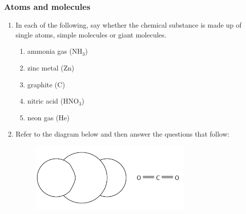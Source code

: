             \subsubsection{ Atoms and molecules         }
            \nopagebreak
            \label{m38120*id308039}\begin{enumerate}[noitemsep, label=\textbf{\arabic*}. ] 
            \label{m38120*uid11}\item In each of the following, say whether the chemical 
substance is made up of single atoms, simple molecules or giant molecules.
\label{m38120*id308055}\begin{enumerate}[noitemsep, label=\textbf{\alph*}. ] 
            \label{m38120*uid12}\item ammonia gas (\begin{math}{\mathrm{NH}}_{3}\end{math})
\label{m38120*uid13}\item zinc metal (\begin{math}\mathrm{Zn}\end{math})
\label{m38120*uid14}\item graphite (\begin{math}\mathrm{C}\end{math})
\label{m38120*uid15}\item nitric acid (\begin{math}{\mathrm{HNO}}_{3}\end{math})
\label{m38120*uid16}\item neon gas (\begin{math}\mathrm{He}\end{math})
\end{enumerate}
                
\label{m38120*uid17}\item Refer to the diagram below and then answer the 
questions that follow:

    \setcounter{subfigure}{0}


	\begin{figure}[H] %
    \begin{center}
    \label{m38120*id308155!!!underscore!!!media}\label{m38120*id308155!!!underscore!!!printimage}\includegraphics[width=300px]{col11305.imgs/m38120_CG10C2_006.png} %
        

\end{center}
\end{figure}
\end{enumerate}
